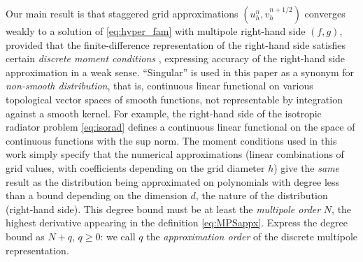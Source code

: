 Our main result is that staggered grid approximations
$(u^n_h,v^{n+1/2}_h)$ 
converges weakly to a solution of \ref{eq:hyper_fam} with multipole right-hand side $(f,g)$, provided that the
finite-difference representation of the right-hand side
satisfies certain {\em discrete moment conditions}
\cite[]{Walden:1999,TorEng:04}, expressing accuracy of the 
right-hand side
approximation in a weak sense. ``Singular'' is used in
this paper as a synonym for {\em non-smooth distribution}, that is,
continuous linear functional on various topological vector spaces of
smooth functions, not representable by integration against a smooth kernel. For example, the right-hand side of the isotropic
radiator problem \ref{eq:isorad} defines a continuous linear
functional on the space of continuous functions with the sup norm. The
moment conditions used in this work simply specify that the numerical
approximations (linear combinations of grid values, with coefficients
depending on the grid diameter $h$) give the {\em same} result as the distribution being
approximated on polynomials with degree less than a bound depending on
the dimension $d$, the nature of the distribution (right-hand
side). This degree bound must be at least the {\em multipole order}
$N$, the highest derivative appearing in the definition
\ref{eq:MPSappx}. Express the degree bound as $N+q$, $q \ge 0$: we
call $q$ the {\em approximation order} of the discrete multipole representation.

